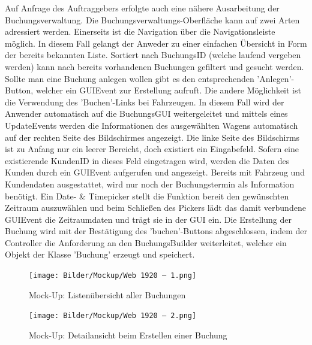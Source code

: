 Auf Anfrage des Auftraggebers erfolgte auch eine nähere Ausarbeitung der Buchungsverwaltung.
Die Buchungsverwaltungs-Oberfläche kann auf zwei Arten adressiert werden. 
Einerseits ist die Navigation über die Navigationsleiste möglich. 
In diesem Fall gelangt der Anweder zu einer einfachen Übersicht in Form der bereits bekannten Liste. 
Sortiert nach BuchungsID (welche laufend vergeben werden) kann nach bereits vorhandenen Buchungen gefiltert und gesucht werden. 
Sollte man eine Buchung anlegen wollen gibt es den entsprechenden 'Anlegen'-Button, welcher ein GUIEvent zur Erstellung aufruft. 
Die andere Möglichkeit ist die Verwendung des 'Buchen'-Links bei Fahrzeugen. 
In diesem Fall wird der Anwender automatisch auf die BuchungsGUI weitergeleitet und mittels eines UpdateEvents werden die Informationen des ausgewählten Wagens automatisch auf der rechten Seite des Bildschirmes angezeigt. 
Die linke Seite des Bildschirms ist zu Anfang nur ein leerer Bereicht, doch existiert ein Eingabefeld. 
Sofern eine existierende KundenID in dieses Feld eingetragen wird, werden die Daten des Kunden durch ein GUIEvent aufgerufen und angezeigt. 
Bereits mit Fahrzeug und Kundendaten ausgestattet, wird nur noch der Buchungstermin als Information benötigt. 
Ein Date- \& Timepicker stellt die Funktion bereit den gewünschten Zeitraum auszuwählen und beim Schließen des Pickers lädt das damit verbundene GUIEvent die Zeitraumdaten und trägt sie in der GUI ein. 
Die Erstellung der Buchung wird mit der Bestätigung des 'buchen'-Buttons abgeschlossen, indem der Controller die Anforderung an den BuchungsBuilder weiterleitet, welcher ein Objekt der Klasse 'Buchung' erzeugt und speichert. 

\begin{figure}[!ht]
    \centering
    \texttt{[image: Bilder/Mockup/Web 1920 – 1.png]}
    \caption{Mock-Up: Listenübersicht aller Buchungen}
    \label{mu:buchung_verwalten}
\end{figure}

\begin{figure}[!ht]
    \centering
    \texttt{[image: Bilder/Mockup/Web 1920 – 2.png]}
    \caption{Mock-Up: Detailansicht beim Erstellen einer Buchung}
    \label{mu:buchung_anlegen}
\end{figure}
